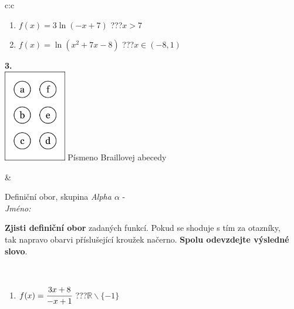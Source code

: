 \documentclass[10pt]{report}
\begin{document}
\begin{tabular}{c:c}
\begin{minipage}[c][104.5mm][t]{0.5\linewidth}
\begin{center}
\begin{minipage}{0.79\linewidth}
\begin{center}
\begin{varwidth}{\linewidth}
\begin{enumerate}
\item $f(x)=3\ln{(-x+7)}$\quad \dotfill\; ???\;\dotfill \quad $x>7$
\item $f(x)=\ln{(x^2+7x-8)}$\quad \dotfill\; ???\;\dotfill \quad $x\in(-8 , 1)$
\end{enumerate}
\end{varwidth}
\end{center}
\end{minipage}
\begin{minipage}{0.20\linewidth}
\begin{center}
{\Huge\bfseries 3.} \\[2mm]
\includegraphics[height=40mm]{../images/braille.png}
{\small Písmeno Braillovej abecedy}
\end{center}
\end{minipage}
\end{center}
\end{minipage}
&
\begin{minipage}[c][104.5mm][t]{0.5\linewidth}
\begin{center}
\vspace{7mm}
{\huge Definiční obor, skupina \textit{Alpha $\alpha$} -}\\[5mm]
\textit{Jméno:}\phantom{xxxxxxxxxxxxxxxxxxxxxxxxxxxxxxxxxxxxxxxxxxxxxxxxxxxxxxxxxxxxxxxxx}\\[5mm]
\begin{minipage}{0.95\linewidth}
\begin{center}
\textbf{Zjisti definiční obor} zadaných funkcí. Pokud se shoduje s tím za otazníky,\\tak napravo obarvi příslušející kroužek načerno. \textbf{Spolu odevzdejte výsledné slovo}.
\end{center}
\end{minipage}
\\[1mm]
\begin{minipage}{0.79\linewidth}
\begin{center}
\begin{varwidth}{\linewidth}
\begin{enumerate}
\normalsizerrr
\item $f(x)=\cfrac{3x+8}{-x+1}$\quad \dotfill\; ???\;\dotfill \quad $\mathbb{R}\smallsetminus\{-1\}$

\end{enumerate}
\end{varwidth}
\end{center}
\end{minipage}
\end{center}
\end{minipage}
\end{tabular}
\end{document}
